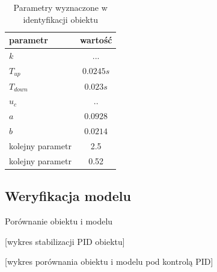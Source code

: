 \begin{table}[H]
\begin{center}
  \begin{tabular}{| l | c | }
    \hline
    parametr 	& wartość \\ \hline
    $k$ & ... \\ \hline
    $T_{up}$ & $0.0245 s$  \\ \hline
	$T_{down}$ & $0.023 s$  \\ \hline
	$u_c$ & .. 	 \\ \hline
    $a$ 		  	& $0.0928$ \\ \hline
    $b$		  	& $0.0214$ \\ \hline
    kolejny parametr 			& 2.5 \\ \hline
    kolejny parametr 		& 0.52 \\
    \hline
  \end{tabular}
  \caption{Parametry wyznaczone w identyfikacji obiektu}
  \label{tab:parametry_ident}
\end{center}
\end{table}

\subsection{Weryfikacja modelu}

Porównanie obiektu i modelu 

[wykres stabilizacji PID obiektu]

[wykres porównania obiektu i modelu pod kontrolą PID]



